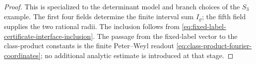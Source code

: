 \begin{proof}
  This is  specialized to
  the determinant model and branch choices of the \(S_3\) example.  The first
  four fields determine the finite interval sum \(I_\varrho\); the fifth field
  supplies the two rational radii.  The inclusion follows from
  \eqref{eq:fixed-label-certificate-interface-inclusion}.  The passage from
  the fixed-label vector to the class-product constants is the finite
  Peter--Weyl readout
  \eqref{eq:class-product-fourier-coordinates}; no additional analytic
  estimate is introduced at that stage.
\end{proof}
